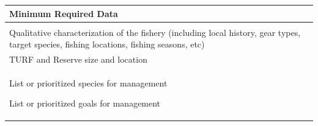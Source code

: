 \documentclass[]{book}
\begin{document}
\begin{longtable}[]{@{}l@{}}
\toprule
\begin{minipage}[b]{0.48\columnwidth}\raggedright\strut
\textbf{Minimum Required Data}\strut
\end{minipage}\tabularnewline
\midrule
\endhead
\begin{minipage}[t]{0.48\columnwidth}\raggedright\strut
\strut
\end{minipage}\tabularnewline
\begin{minipage}[t]{0.48\columnwidth}\raggedright\strut
Qualitative characterization of the fishery (including local history,
gear types, target species, fishing locations, fishing seasons,
etc)\strut
\end{minipage}\tabularnewline
\begin{minipage}[t]{0.48\columnwidth}\raggedright\strut
TURF and Reserve size and location\strut
\end{minipage}\tabularnewline
\begin{minipage}[t]{0.97\columnwidth}\raggedright\strut
List or prioritized species for management

List or prioritized goals for management


\end{minipage}
\end{longtable}
\end{document}
